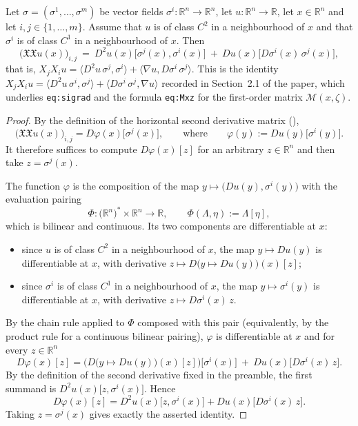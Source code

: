 \begin{lemma}
Let $\sigma=(\sigma^1,\dots,\sigma^m)$ be vector fields $\sigma^i:\mathbb{R}^n\to\mathbb{R}^n$, let
$u:\mathbb{R}^n\to\mathbb{R}$, let $x\in\mathbb{R}^n$ and let $i,j\in\{1,\dots,m\}$. Assume that
$u$ is of class $C^2$ in a neighbourhood of $x$ and that $\sigma^i$ is of class $C^1$ in a
neighbourhood of $x$. Then
$$\big(\mathfrak{X}\mathfrak{X}u(x)\big)_{i,j}\ =\
D^2u(x)\big[\sigma^j(x),\sigma^i(x)\big]\ +\ Du(x)\big[D\sigma^i(x)\,\sigma^j(x)\big],$$
that is, $X_jX_iu=\langle D^2u\,\sigma^j,\sigma^i\rangle+\langle\nabla
u,D\sigma^i\,\sigma^j\rangle$. This is the identity $X_jX_iu=\langle
D^2u\,\sigma^i,\sigma^j\rangle+\langle D\sigma^i\,\sigma^j,\nabla u\rangle$ recorded in
Section~2.1 of the paper, which underlies \texttt{eq:sigrad} and the formula \texttt{eq:Mxz} for
the first-order matrix $\mathcal{M}(x,\zeta)$.
\end{lemma}
\begin{proof}
By the definition of the horizontal second derivative matrix (),
$$\big(\mathfrak{X}\mathfrak{X}u(x)\big)_{i,j}=D\varphi(x)\big[\sigma^j(x)\big],\qquad\text{where}
\qquad \varphi(y):=Du(y)\big[\sigma^i(y)\big].$$
It therefore suffices to compute $D\varphi(x)[z]$ for an arbitrary $z\in\mathbb{R}^n$ and then take
$z=\sigma^j(x)$.

The function $\varphi$ is the composition of the map
$y\mapsto\big(Du(y),\sigma^i(y)\big)$ with the evaluation pairing
$$\Phi:\big(\mathbb{R}^n\big)^*\times\mathbb{R}^n\to\mathbb{R},\qquad
\Phi(\Lambda,\eta):=\Lambda[\eta],$$
which is bilinear and continuous. Its two components are differentiable at $x$:
\begin{itemize}
\item since $u$ is of class $C^2$ in a neighbourhood of $x$, the map $y\mapsto Du(y)$ is
differentiable at $x$, with derivative $z\mapsto D\big(y\mapsto Du(y)\big)(x)[z]$;
\item since $\sigma^i$ is of class $C^1$ in a neighbourhood of $x$, the map $y\mapsto\sigma^i(y)$
is differentiable at $x$, with derivative $z\mapsto D\sigma^i(x)\,z$.
\end{itemize}
By the chain rule applied to $\Phi$ composed with this pair (equivalently, by the product rule for
a continuous bilinear pairing), $\varphi$ is differentiable at $x$ and for every
$z\in\mathbb{R}^n$
$$D\varphi(x)[z]=\Big(D\big(y\mapsto Du(y)\big)(x)[z]\Big)\big[\sigma^i(x)\big]
\ +\ Du(x)\big[D\sigma^i(x)\,z\big].$$
By the definition of the second derivative fixed in the preamble, the first summand is
$D^2u(x)\big[z,\sigma^i(x)\big]$. Hence
$$D\varphi(x)[z]=D^2u(x)\big[z,\sigma^i(x)\big]+Du(x)\big[D\sigma^i(x)\,z\big].$$
Taking $z=\sigma^j(x)$ gives exactly the asserted identity.
\end{proof}
